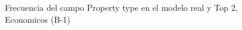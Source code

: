 \begin{figure}[H]
    \centering
    
    \caption{Frecuencia del campo Property type en el modelo real y Top 2, Economicos (B-1)}
    \label{frecuency-Property Type-top2}
\end{figure}